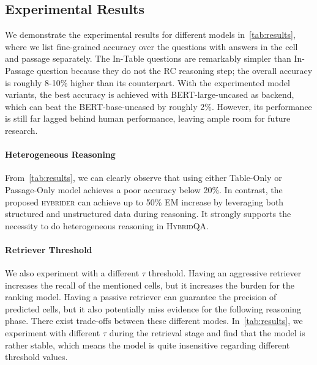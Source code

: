\documentclass[11pt,a4paper]{article}
\newcommand{\dataset}{\textsc{HybridQA}\xspace}
\newcommand{\model}{\textsc{hybrider}\xspace}
\begin{document}
\subsection{Experimental Results}
We demonstrate the experimental results for different models in~\autoref{tab:results}, where we list fine-grained accuracy over the questions with answers in the cell and passage separately.  The In-Table questions are remarkably simpler than In-Passage question because they do not the RC reasoning step; the overall accuracy is roughly 8-10\% higher than its counterpart. With the experimented model variants, the best accuracy is achieved with BERT-large-uncased as backend, which can beat the BERT-base-uncased by roughly 2\%. However, its performance is still far lagged behind human performance, leaving ample room for future research.


\paragraph{Heterogeneous Reasoning}
From~\autoref{tab:results}, we can clearly observe that using either Table-Only or Passage-Only model achieves a poor accuracy below 20\%. In contrast, the proposed \model can achieve up to 50\% EM increase by leveraging both structured and unstructured data during reasoning. It strongly supports the necessity to do heterogeneous reasoning in \dataset.
\paragraph{Retriever Threshold}
We also experiment with a different $\tau$ threshold. Having an aggressive retriever increases the recall of the mentioned cells, but it increases the burden for the ranking model. Having a passive retriever can guarantee the precision of predicted cells, but it also potentially miss evidence for the following reasoning phase. There exist trade-offs between these different modes. In~\autoref{tab:results}, we experiment with different $\tau$ during the retrieval stage and find that the model is rather stable, which means the model is quite insensitive regarding different threshold values.
\end{document}
